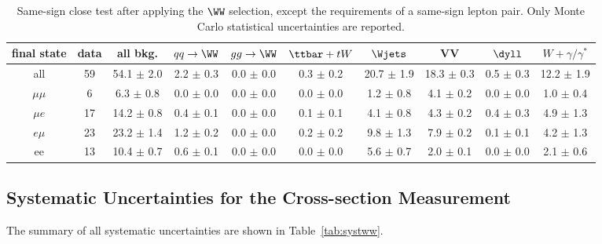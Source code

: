 \begin{table}[ht!]
\begin{center}
{\tiny
\begin{tabular} {|c|c|c|c|c|c|c|c|c|c|}
\hline
final state          &   data & all bkg. & $qq \to \WW$ & $gg \to \WW$ &  $\ttbar+tW$   & $\Wjets$    & VV & $\dyll$ & $W+\gamma/\gamma^*$    \\
  \hline
all          &   59 &   54.1 $\pm$   2.0 &    2.2 $\pm$   0.3 &    0.0 $\pm$   0.0 &    0.3 $\pm$   0.2 &   20.7 $\pm$   1.9 &   18.3 $\pm$   0.3 &    0.5 $\pm$   0.3 &   12.2 $\pm$   1.9    \\
$\mu\mu$     &    6 &    6.3 $\pm$   0.8 &    0.0 $\pm$   0.0 &    0.0 $\pm$   0.0 &    0.0 $\pm$   0.0 &    1.2 $\pm$   0.8 &    4.1 $\pm$   0.2 &    0.0 $\pm$   0.0 &    1.0 $\pm$   0.4    \\
$\mu e$      &   17 &   14.2 $\pm$   0.8 &    0.4 $\pm$   0.1 &    0.0 $\pm$   0.0 &    0.1 $\pm$   0.1 &    4.1 $\pm$   0.8 &    4.3 $\pm$   0.2 &    0.4 $\pm$   0.3 &    4.9 $\pm$   1.3    \\
$e\mu$       &   23 &   23.2 $\pm$   1.4 &    1.2 $\pm$   0.2 &    0.0 $\pm$   0.0 &    0.2 $\pm$   0.2 &    9.8 $\pm$   1.3 &    7.9 $\pm$   0.2 &    0.1 $\pm$   0.1 &    4.2 $\pm$   1.3    \\
 ee          &   13 &   10.4 $\pm$   0.7 &    0.6 $\pm$   0.1 &    0.0 $\pm$   0.0 &    0.0 $\pm$   0.0 &    5.6 $\pm$   0.7 &    2.0 $\pm$   0.1 &    0.0 $\pm$   0.0 &    2.1 $\pm$   0.6    \\
 \hline
\hline
\hline
\end{tabular}
}
\caption{\fixme Same-sign close test after applying the $\WW$ selection, except the requirements of a same-sign 
  	  	 lepton pair. Only Monte Carlo statistical uncertainties are reported.}
\label{tab:wwselection_same_sign}
\end{center}
\end{table}

\subsection{Systematic Uncertainties for the Cross-section Measurement}

The summary of all systematic uncertainties are shown in Table~\ref{tab:systww}.

